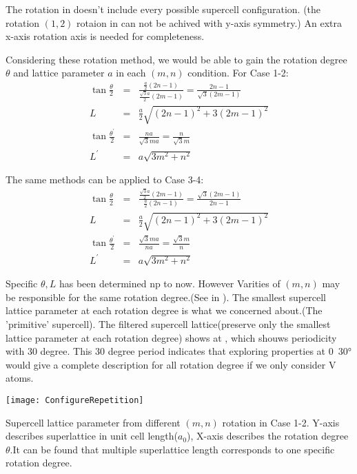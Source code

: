 The rotation in  doesn't include every possible supercell configuration. (\eg the rotation $(1, 2)$ rotaion in  can not be achived with y-axis symmetry.) An extra x-axis rotation axis is needed for completeness.

Considering these rotation method, we would be able to gain the rotation degree $\theta$ and lattice parameter $a$ in each $(m,n)$ condition. For Case 1-2:
\begin{eqnarray}
	\tan \frac{\theta}{2} &=& \frac{\frac{a}{2}(2n - 1)}{\frac{\sqrt{3}a}{2}(2m - 1)} = \frac{2n - 1}{\sqrt{3} (2m - 1)} \label{eqn:thetaCase1} \\
	L &=& \frac{a}{2} \sqrt{(2n - 1)^2 + 3(2m - 1)^2} \label{eqn:lengthCase1}\\
	\tan \frac{\theta^{'}}{2} &=& \frac{na}{\sqrt{3}ma} = \frac{n}{\sqrt{3}m}\label{eqn:thetaCase2} \\
	L^{'} &=& a\sqrt{3m^2 + n^2} \label{eqn:lengthCase2}
\end{eqnarray}

The same methods can be applied to Case 3-4:
\begin{eqnarray}
	\tan \frac{\theta}{2} &=& \frac{\frac{\sqrt{3}a}{2}(2m - 1)}{\frac{a}{2}(2n - 1)} = \frac{\sqrt{3}(2m - 1)}{2n - 1} \\
	L &=& \frac{a}{2} \sqrt{(2n - 1)^2 + 3(2m - 1)^2} \label{eqn:lengthCase3}\\
	\tan \frac{\theta^{'}}{2} &=& \frac{\sqrt{3}ma}{na} = \frac{\sqrt{3}m}{n} \label{eqn:thetaCase4} \\
	L^{'} &=& a\sqrt{3m^2 + n^2} \label{eqn:lengthCase4}
\end{eqnarray}

Specific $\theta, L$ has been determined np to now. However Varities of $(m,n)$ may be responsible for the same rotation degree.(See in ). The smallest supercell lattice parameter at each rotation degree is what we concerned about.(\ie The 'primitive' supercell). The filtered supercell lattice(preserve only the smallest lattice parameter at each rotation degree) shows at , which shouws periodicity with 30 degree. This 30 degree period indicates that exploring properties at 0~30° would give a complete description for all rotation degree if we only consider V atoms.

\begin{marginfigure}[]
	\texttt{[image: ConfigureRepetition]}
	\caption[Supercell lattice parameter from different $(m,n)$ rotation in Case 1-2.]{
		Supercell lattice parameter from different $(m,n)$ rotation in Case 1-2. Y-axis describes superlattice in unit cell length($a_0$), X-axis describes the rotation degree $\theta$.It can be found that multiple superlattice length corresponds to one specific rotation degree.
	}
\end{marginfigure}

